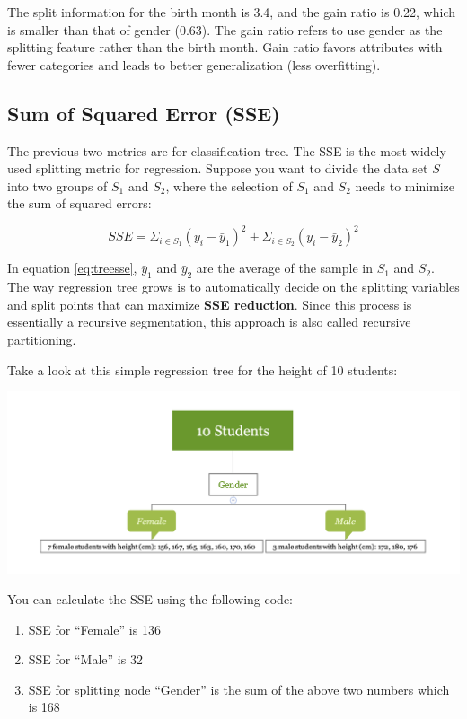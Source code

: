 \documentclass[
  12pt,
]{krantz}
\providecommand{\tightlist}{%
  \setlength{\itemsep}{0pt}\setlength{\parskip}{0pt}}
\begin{document}
The split information for the birth month is 3.4, and the gain ratio is 0.22, which is smaller than that of gender (0.63). The gain ratio refers to use gender as the splitting feature rather than the birth month. Gain ratio favors attributes with fewer categories and leads to better generalization (less overfitting).

\hypertarget{sum-of-squared-error-sse}{%
\subsection{Sum of Squared Error (SSE)}\label{sum-of-squared-error-sse}}

The previous two metrics are for classification tree. The SSE is the most widely used splitting metric for regression. Suppose you want to divide the data set \(S\) into two groups of \(S_{1}\) and \(S_{2}\), where the selection of \(S_{1}\) and \(S_{2}\) needs to minimize the sum of squared errors:

\begin{equation}
SSE=\Sigma_{i\in S_{1}}(y_{i}-\bar{y}_{1})^{2}+\Sigma_{i\in S_{2}}(y_{i}-\bar{y}_{2})^{2}
\label{eq:treesse}
\end{equation}

In equation \eqref{eq:treesse}, \(\bar{y}_{1}\) and \(\bar{y}_{2}\) are the average of the sample in \(S_{1}\) and \(S_{2}\). The way regression tree grows is to automatically decide on the splitting variables and split points that can maximize \textbf{SSE reduction}. Since this process is essentially a recursive segmentation, this approach is also called recursive partitioning.

Take a look at this simple regression tree for the height of 10 students:

\includegraphics{images/varEN.png}

You can calculate the SSE using the following code:

\begin{enumerate}
\def\labelenumi{\arabic{enumi}.}
\tightlist
\item
  SSE for ``Female'' is 136
\item
  SSE for ``Male'' is 32
\item
  SSE for splitting node ``Gender'' is the sum of the above two numbers which is 168
\end{enumerate}
\end{document}
